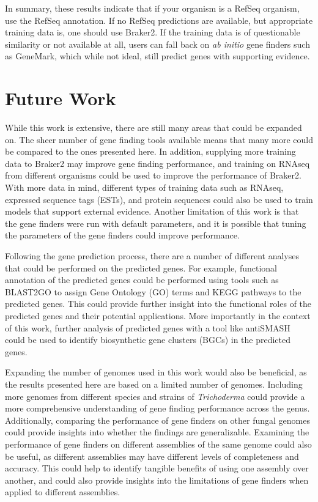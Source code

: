 In summary, these results indicate that if your organism is a RefSeq
organism, use the RefSeq annotation. If no RefSeq predictions are
available, but appropriate training data is, one should use Braker2. If
the training data is of questionable similarity or not available at
all, users can fall back on \textit{ab initio} gene finders such as
GeneMark, which while not ideal, still predict genes with supporting
evidence.

\section{Future Work}

While this work is extensive, there are still many areas that could be
expanded on. The sheer number of gene finding tools available means
that many more could be compared to the ones presented here. In
addition, supplying more training data to Braker2 may improve gene
finding performance, and training on RNAseq from different organisms
could be used to improve the performance of Braker2. With more data in mind, different types of training data such as RNAseq,
expressed sequence tags (ESTs), and protein sequences could also be
used to train models that support external evidence. Another
limitation of this work is that the gene finders were run with default
parameters, and it is possible that tuning the parameters of the gene
finders could improve performance.

Following the gene prediction process, there are a number of different
analyses that could be performed on the predicted genes. For example,
functional annotation of the predicted genes could be performed using
tools such as BLAST2GO to assign Gene Ontology (GO) terms and KEGG
pathways to the predicted genes. This could provide further insight
into the functional roles of the predicted genes and their potential
applications. More importantly in the context of this work, further analysis
of predicted genes with a tool like antiSMASH could be used to
identify biosynthetic gene clusters (BGCs) in the predicted genes.

Expanding the number of genomes used in this work would also be
beneficial, as the results presented here are based on a limited
number of genomes. Including more genomes from different species and
strains of \textit{Trichoderma} could provide a more comprehensive
understanding of gene finding performance across the
genus. Additionally, comparing the performance of gene finders on
other fungal genomes could provide insights into whether the findings
are generalizable. Examining the performance of gene finders on
different assemblies of the same genome could also be useful, as
different assemblies may have different levels of completeness and
accuracy. This could help to identify tangible benefits of using one
assembly over another, and could also provide insights into the
limitations of gene finders when applied to different assemblies.

